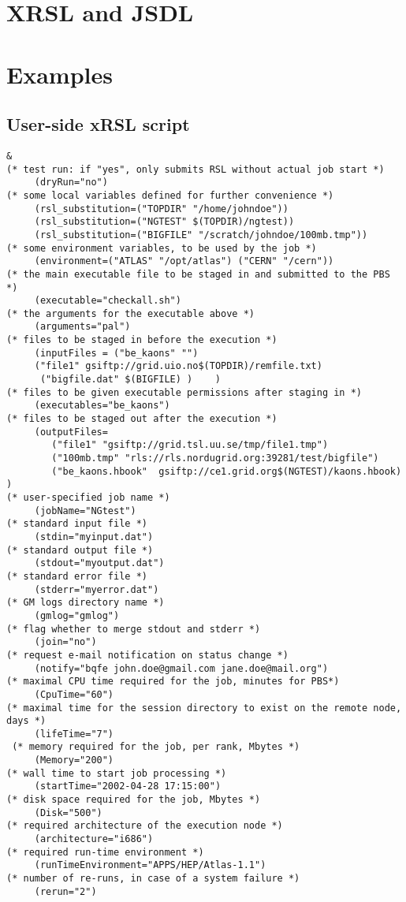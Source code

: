 \documentclass{book}
\begin{document}
  \chapter{XRSL and JSDL}
  \label{sec:jsdl}

  

  \appendix

  \chapter{Examples}
  \label{sec:examples}

  \section{User-side xRSL script}

  \begin{verbatim}
&
(* test run: if "yes", only submits RSL without actual job start *)
     (dryRun="no")
(* some local variables defined for further convenience *)
     (rsl_substitution=("TOPDIR" "/home/johndoe"))
     (rsl_substitution=("NGTEST" $(TOPDIR)/ngtest))
     (rsl_substitution=("BIGFILE" "/scratch/johndoe/100mb.tmp"))
(* some environment variables, to be used by the job *)
     (environment=("ATLAS" "/opt/atlas") ("CERN" "/cern"))
(* the main executable file to be staged in and submitted to the PBS *)
     (executable="checkall.sh")
(* the arguments for the executable above *)
     (arguments="pal")
(* files to be staged in before the execution *)
     (inputFiles = ("be_kaons" "")
     ("file1" gsiftp://grid.uio.no$(TOPDIR)/remfile.txt)
      ("bigfile.dat" $(BIGFILE) )    )
(* files to be given executable permissions after staging in *)
     (executables="be_kaons")
(* files to be staged out after the execution *)
     (outputFiles=
        ("file1" "gsiftp://grid.tsl.uu.se/tmp/file1.tmp")
        ("100mb.tmp" "rls://rls.nordugrid.org:39281/test/bigfile")
        ("be_kaons.hbook"  gsiftp://ce1.grid.org$(NGTEST)/kaons.hbook)   )
(* user-specified job name *)
     (jobName="NGtest")
(* standard input file *)
     (stdin="myinput.dat")
(* standard output file *)
     (stdout="myoutput.dat")
(* standard error file *)
     (stderr="myerror.dat")
(* GM logs directory name *)
     (gmlog="gmlog")
(* flag whether to merge stdout and stderr *)
     (join="no")
(* request e-mail notification on status change *)
     (notify="bqfe john.doe@gmail.com jane.doe@mail.org")
(* maximal CPU time required for the job, minutes for PBS*)
     (CpuTime="60")
(* maximal time for the session directory to exist on the remote node, days *)
     (lifeTime="7")
 (* memory required for the job, per rank, Mbytes *)
     (Memory="200")
(* wall time to start job processing *)
     (startTime="2002-04-28 17:15:00")
(* disk space required for the job, Mbytes *)
     (Disk="500")
(* required architecture of the execution node *)
     (architecture="i686")
(* required run-time environment *)
     (runTimeEnvironment="APPS/HEP/Atlas-1.1")
(* number of re-runs, in case of a system failure *)
     (rerun="2")
  \end{verbatim}
\end{document}
